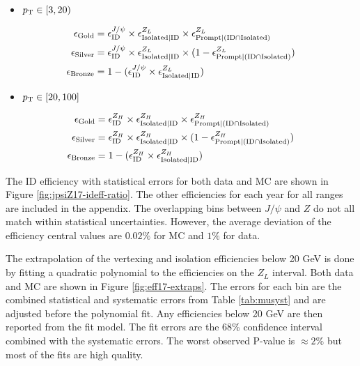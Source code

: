 \begin{itemize}
\item[] $p_{\mathrm{T}} \in [3,20)$
\end{itemize}
\begin{equation}\label{eq:effcomp_J}
\begin{split}
\epsilon_{\text{Gold}}& = \epsilon_{\text{ID}}^{J/\psi}\times \epsilon_{\text{Isolated}|\text{ID}}^{Z_L} \times \epsilon_{\text{Prompt}|(\text{ID} \cap \text{Isolated})}^{Z_L} \\
\epsilon_{\text{Silver}}& = \epsilon_{\text{ID}}^{J/\psi} \times \epsilon_{\text{Isolated}|\text{ID}}^{Z_L} \times (1-\epsilon_{\text{Prompt}|(\text{ID} \cap \text{Isolated})}^{Z_L}) \\
\epsilon_{\text{Bronze}}& = 1-(\epsilon_{\text{ID}}^{J/\psi} \times \epsilon_{\text{Isolated}|\text{ID}}^{Z_L})
\end{split}
\end{equation}
\begin{itemize}
\item[] $p_{\mathrm{T}} \in [20,100 ]$
\end{itemize}
\begin{equation}\label{eq:effcomp_Z}
\begin{split}
\epsilon_{\text{Gold}}& = \epsilon_{\text{ID}}^{Z_H}\times\epsilon_{\text{Isolated}|\text{ID}}^{Z_H}\times\epsilon_{\text{Prompt}|(\text{ID} \cap \text{Isolated})}^{Z_H} \\
\epsilon_{\text{Silver}}& = \epsilon_{\text{ID}}^{Z_H}\times\epsilon_{\text{Isolated}|\text{ID}}^{Z_H}\times(1-\epsilon_{\text{Prompt}|(\text{ID} \cap \text{Isolated})}^{Z_H})\\
\epsilon_{\text{Bronze}}& = 1-(\epsilon_{\text{ID}}^{Z_H} \times \epsilon_{\text{Isolated}|\text{ID}}^{Z_H})
\end{split}
\end{equation}

 The ID efficiency with statistical errors for both data and MC are shown in Figure \ref{fig:jpsiZ17-ideff-ratio}. The other efficiencies for each year for all \pt ranges are included in the appendix. The overlapping bins between $J/\psi$ and $Z$ do not all match within statistical uncertainties. However, the average deviation of the efficiency central values are $0.02\%$ for MC and $1\%$ for data.  



The extrapolation of the vertexing and isolation efficiencies below 20 GeV is done by fitting a quadratic polynomial to the efficiencies on the $Z_L$ interval.  Both data and MC are shown in Figure \ref{fig:eff17-extraps}.  The errors for each bin are the combined statistical and systematic errors from Table \ref{tab:musyst} and are adjusted before the polynomial fit. Any efficiencies below 20 GeV are then reported from the fit model. The fit errors are the 68\% confidence interval combined with the systematic errors. The worst observed P-value is $\approx 2\%$ but most of the fits are high quality.

